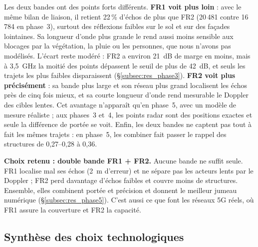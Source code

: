 \documentclass[12pt,a4paper,titlepage]{article}
\begin{document}
Les deux bandes ont des points forts différents. \textbf{FR1 voit plus loin} : avec le même bilan de liaison, il retient 22\,\% d'échos de plus que FR2 (20\,481 contre 16\,784 en phase~3), surtout des réflexions faibles sur le sol et sur des façades lointaines. Sa longueur d'onde plus grande le rend aussi moins sensible aux blocages par la végétation, la pluie ou les personnes, que nous n'avons pas modélisés. L'écart reste modéré : FR2 a environ 21~dB de marge en moins, mais à 3,5~GHz la moitié des points dépassent le seuil de plus de 42~dB, et seuls les trajets les plus faibles disparaissent (\S\ref{subsec:res_phase3}). \textbf{FR2 voit plus précisément} : sa bande plus large et son réseau plus grand localisent les échos près de cinq fois mieux, et sa courte longueur d'onde rend mesurable le Doppler des cibles lentes. Cet avantage n'apparaît qu'en phase~5, avec un modèle de mesure réaliste ; aux phases~3 et~4, les points radar sont des positions exactes et seule la différence de portée se voit. Enfin, les deux bandes ne captent pas tout à fait les mêmes trajets : en phase~5, les combiner fait passer le rappel des structures de 0,27--0,28 à 0,36.

\textbf{Choix retenu : double bande FR1 + FR2.} Aucune bande ne suffit seule. FR1 localise mal ses échos (2~m d'erreur) et ne sépare pas les acteurs lents par le Doppler ; FR2 perd davantage d'échos faibles et couvre moins de structures. Ensemble, elles combinent portée et précision et donnent le meilleur jumeau numérique (\S\ref{subsec:res_phase5}). C'est aussi ce que font les réseaux 5G réels, où FR1 assure la couverture et FR2 la capacité.

\subsection{Synthèse des choix technologiques}
\end{document}
